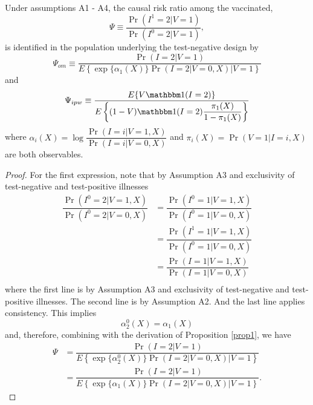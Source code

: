 \begin{appendix}
    \begin{theorem}\label{theorem1}
    Under assumptions A1 - A4, the causal risk ratio among the vaccinated, 
    \begin{equation*}
        \Psi \equiv \dfrac{\Pr(I^1=2|V=1)}{\Pr(I^0=2|V=1)},
    \end{equation*}
    is identified in the population underlying the test-negative design by 
    \begin{equation}
        \Psi_{om} \equiv \dfrac{\Pr(I = 2 | V = 1)}{E\left\{ \exp\{\alpha_1(X)\} \Pr(I = 2 | V = 0, X) \Big| V = 1 \right\}}
    \end{equation}
    and 
    \begin{equation}
        \Psi_{ipw} \equiv \dfrac{E\{V \mathbbm 1 (I = 2)\}}{E\left\{ (1 - V) \mathbbm 1(I = 2) \dfrac{\pi_1(X)}{1 - \pi_1(X)}\right\}}
    \end{equation}
    where $\alpha_i(X) = \log \dfrac{\Pr(I =i | V = 1, X)}{\Pr(I =i | V = 0, X)}$ and $\pi_i(X) = \Pr(V = 1 | I = i, X)$ are both observables. 
    \end{theorem}
    
    \begin{proof}
    For the first expression, note that by Assumption A3 and exclusivity of test-negative and test-positive illnesses
    \begin{align*}
        \dfrac{\Pr(I^0 = 2 | V = 1, X)}{\Pr(I^0 = 2 | V = 0, X)} &= \dfrac{\Pr(I^0 = 1 | V = 1, X)}{\Pr(I^0 = 1 | V = 0, X)} \\
        &= \dfrac{\Pr(I^1 = 1 | V = 1, X)}{\Pr(I^0 = 1 | V = 0, X)} \\
        &= \dfrac{\Pr(I = 1 | V = 1, X)}{\Pr(I = 1 | V = 0, X)} \\
    \end{align*}
    where the first line is by Assumption A3 and exclusivity of test-negative and test-positive illnesses. The second line is by Assumption A2. And the last line applies consistency. This implies
    \begin{equation*}
        \alpha_2^0(X) = \alpha_1(X)
    \end{equation*}
    and, therefore, combining with the derivation of Proposition \ref{prop1}, we have
    \begin{align*}
        \Psi &= \dfrac{\Pr(I = 2 | V = 1)}{E\left\{ \exp\{\alpha^0_2(X)\} \Pr(I = 2 | V = 0, X) \Big| V = 1 \right\}} \\
        &= \dfrac{\Pr(I = 2 | V = 1)}{E\left\{ \exp\{\alpha_1(X)\} \Pr(I = 2 | V = 0, X) \Big| V = 1 \right\}}.
    \end{align*}
    

\end{proof}
\end{appendix}
